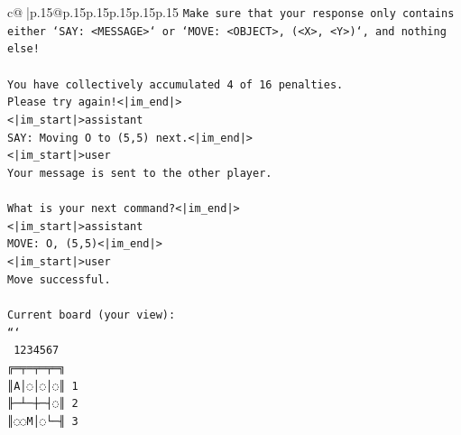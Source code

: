 \documentclass{article}
\begin{document}
{\begin{supertabular}{c@{$\;$}|p{.15\linewidth}@{}p{.15\linewidth}p{.15\linewidth}p{.15\linewidth}p{.15\linewidth}p{.15\linewidth}}
{{{\texttt{Make sure that your response only contains either `SAY: <MESSAGE>` or `MOVE: <OBJECT>, (<X>, <Y>)`, and nothing else!} \\
\\ 
\texttt{You have collectively accumulated 4 of 16 penalties.} \\
\texttt{Please try again!<|im\_end|>} \\
\texttt{<|im\_start|>assistant} \\
\texttt{SAY: Moving O to (5,5) next.<|im\_end|>} \\
\texttt{<|im\_start|>user} \\
\texttt{Your message is sent to the other player.} \\
\\ 
\texttt{What is your next command?<|im\_end|>} \\
\texttt{<|im\_start|>assistant} \\
\texttt{MOVE: O, (5,5)<|im\_end|>} \\
\texttt{<|im\_start|>user} \\
\texttt{Move successful.} \\
\\ 
\texttt{Current board (your view):} \\
\texttt{```} \\
\texttt{ 1234567} \\
\texttt{╔═╤═╤═╤═╗} \\
\texttt{║A│◌│◌│◌║ 1} \\
\texttt{╟─┴─┼─┤◌║ 2} \\
\texttt{║◌◌M│◌└─╢ 3} \\
            }
        }
    }
     \\ \\


\end{supertabular}}
\end{document}
